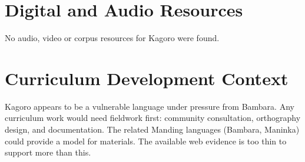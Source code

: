 \documentclass[12pt]{article}
\begin{document}
\section{Digital and Audio Resources}
No audio, video or corpus resources for Kagoro were found.

\section{Curriculum Development Context}
Kagoro appears to be a vulnerable language under pressure from Bambara. Any curriculum work would need fieldwork first: community consultation, orthography design, and documentation. The related Manding languages (Bambara, Maninka) could provide a model for materials. The available web evidence is too thin to support more than this.
\end{document}
